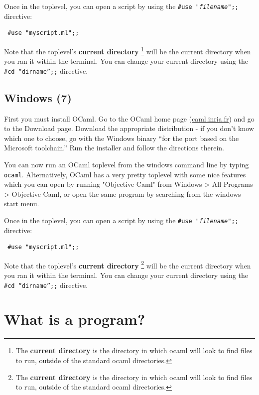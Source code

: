 \documentclass[10pt]{book}
\begin{document}
Once in the toplevel, you can open a script by using the {\tt \#use "{\it filename}";;} directive:

\beforeverb
\begin{verbatim}
 #use "myscript.ml";;
\end{verbatim}
\afterverb

Note that the toplevel's {\bf current directory} \footnote{The {\bf current directory} is the 
directory in which ocaml will look to find files to run, outside of the standard ocaml directories.} 
will be the current directory when you ran it within the terminal. You can change your current directory 
using the {\tt \#cd ``{\it dirname}'';;} directive.

\subsection{Windows (7)}

First you must install OCaml. Go to the OCaml home page (\url{caml.inria.fr}) and go to the Download 
page. Download the appropriate distribution - if you don't know which one to choose, go with the 
Windows binary ``for the port based on the Microsoft toolchain.'' Run the installer and follow the 
directions therein.

You can now run an OCaml toplevel from the windows command line by typing {\tt ocaml}. Alternatively,
OCaml has a very pretty toplevel with some nice features which you can open by running "Objective Caml"
from Windows > All Programs > Objective Caml, or open the same program by searching from the windows 
start menu.

Once in the toplevel, you can open a script by using the {\tt \#use "{\it filename}";;} directive:

\beforeverb
\begin{verbatim}
 #use "myscript.ml";;
\end{verbatim}
\afterverb

Note that the toplevel's {\bf current directory} \footnote{The {\bf current directory} is the 
directory in which ocaml will look to find files to run, outside of the standard ocaml directories.} 
will be the current directory when you ran it within the terminal. You can change your current directory 
using the {\tt \#cd ``{\it dirname}'';;} directive.

\section{What is a program?}
\end{document}
